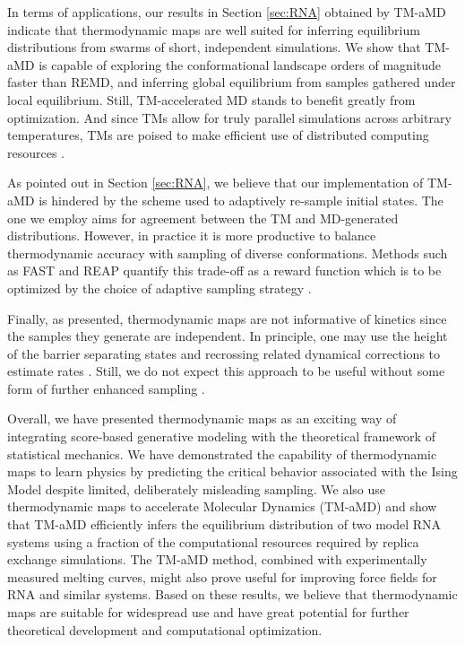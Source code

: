 \documentclass[9pt,twocolumn,twoside]{pnas-new}
\begin{document}
{In terms of applications, our results in Section \ref{sec:RNA} obtained by TM-aMD indicate that thermodynamic maps are well suited for inferring equilibrium distributions from swarms of short, independent simulations. We show that TM-aMD is capable of exploring the conformational landscape orders of magnitude faster than REMD, and inferring global equilibrium from samples gathered under local equilibrium. Still, TM-accelerated MD stands to benefit greatly from optimization. And since TMs allow for truly parallel simulations across arbitrary temperatures, TMs are poised to make efficient use of distributed computing resources \cite{folding-at-home}. 

As pointed out in Section \ref{sec:RNA}, we believe that our implementation of TM-aMD is hindered by the scheme used to adaptively re-sample initial states. The one we employ aims for agreement between the TM and MD-generated distributions. However, in practice it is more productive to balance thermodynamic accuracy with sampling of diverse conformations. Methods such as FAST and REAP quantify this trade-off as a reward function which is to be optimized by the choice of adaptive sampling strategy \cite{FAST,REAP}.

Finally, as presented, thermodynamic maps are not informative of kinetics since the samples they generate are independent. In principle, one may use the height of the barrier separating states and recrossing related dynamical corrections to estimate rates \cite{berne1988classical}. Still, we do not expect this approach to be useful without some form of further enhanced sampling \cite{tiwary2013metadynamics}.

Overall, we have presented thermodynamic maps as an exciting way of integrating score-based generative modeling with the theoretical framework of statistical mechanics. We have demonstrated the capability of thermodynamic maps to learn physics by predicting the critical behavior associated with the Ising Model despite limited, deliberately misleading sampling. We also use thermodynamic maps to accelerate Molecular Dynamics (TM-aMD) and show that TM-aMD efficiently infers the equilibrium distribution of two model RNA systems using a fraction of the computational resources required by replica exchange simulations. The TM-aMD method, combined with experimentally measured melting curves, might also prove useful for improving force fields for RNA and similar systems. Based on these results, we believe that thermodynamic maps are suitable for widespread use and have great potential for further theoretical development and computational optimization.

}
\end{document}
